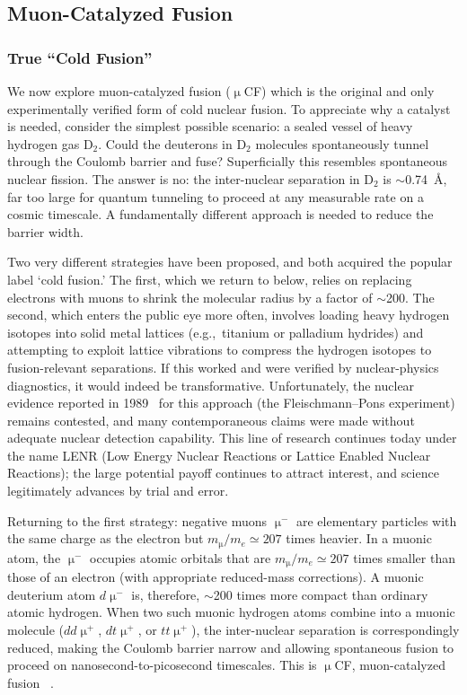 \documentclass[particles,article,accept,pdftex,moreauthors]{Definitions/mdpi}
\begin{document}
\subsection{Muon-Catalyzed Fusion}\label{ssec:MuonCatalyzed}
\subsubsection{True ``Cold Fusion''}\label{sssec:CF}
We now explore muon-catalyzed fusion ($\upmu$CF) which is the original and only experimentally verified form of cold nuclear fusion. To appreciate why a catalyst is needed, consider the simplest possible scenario: a sealed vessel of heavy hydrogen gas D$_2$. Could the deuterons in D$_2$ molecules spontaneously tunnel through the Coulomb barrier and fuse? Superficially this resembles spontaneous nuclear fission. The answer is no: the inter-nuclear separation in D$_2$ is $\sim$0.74~\AA, far too large for quantum tunneling to proceed at any measurable rate on a cosmic timescale. A fundamentally different approach is needed to reduce the barrier width.

Two very different strategies have been proposed, and both acquired the popular label `cold fusion.' The first, which we return to below, relies on replacing electrons with muons to shrink the molecular radius by a factor of $\sim$200. The second, which enters the public eye more often, involves loading heavy hydrogen isotopes into solid metal lattices (e.g.,\ titanium or palladium hydrides) and attempting to exploit lattice vibrations to compress the hydrogen isotopes to fusion-relevant separations. If this worked and were verified by nuclear-physics diagnostics, it would indeed be transformative. Unfortunately, the nuclear evidence reported in 1989~\cite{Jones:1989dv} for this approach (the Fleischmann--Pons experiment) remains contested, and many contemporaneous claims were made without adequate nuclear detection capability. This line of research continues today under the name LENR (Low Energy Nuclear Reactions or Lattice Enabled Nuclear Reactions); the large potential payoff continues to attract interest, and science legitimately advances by trial and error.

Returning to the first strategy: negative muons $\upmu^-$ are elementary particles with the same charge as the electron but $m_\upmu/m_e\simeq 207$ times heavier. In a muonic atom, the $\upmu^-$ occupies atomic orbitals that are $m_\upmu/m_e\simeq 207$ times smaller than those of an electron (with appropriate reduced-mass corrections). A muonic deuterium atom $d\upmu^-$ is, therefore, $\sim$200 times more compact than ordinary atomic hydrogen. When two such muonic hydrogen atoms combine into a muonic molecule ($dd\upmu^+$, $dt\upmu^+$, or $tt\upmu^+$), the inter-nuclear separation is correspondingly reduced, making the Coulomb barrier narrow and allowing spontaneous fusion to proceed on nanosecond-to-picosecond timescales. This is $\upmu$CF, muon-catalyzed fusion ~\cite{Rafelski:1987Jones,Rafelski:1990gg,Rafelski:1990in}.
\end{document}
